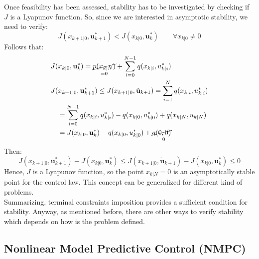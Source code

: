 Once feasibility has been assessed, stability has to be investigated by checking if $J$ is a Lyapunov function. So, since we are interested in asymptotic stability, we need to verify:
\begin{equation}
J(x_{k+1|0},\textbf{u}_{k+1}^*)<J(x_{k|0},\textbf{u}_{k}^*)\qquad \forall x_{k|0} \neq 0
\end{equation}
Follows that:
\begin{equation}
	\begin{split}
		&J(x_{k|0},\textbf{u}_{k}^*)= \underset{=0}{\cancel{p(x_{k|N})}}+\sum_{i=0}^{N-1} q(x_{k|i},u_{k|i}^*) \\
		&J(x_{k+1|0},\textbf{u}_{k+1}^*) \leq J(x_{k+1|0},\tilde{\textbf{u}}_{k+1})=\sum_{i=1}^{N}q(x_{k|i},u_{k|i}^*) \\
		 &\ \ \ = \sum_{i=0}^{N-1}q(x_{k|i},u_{k|i}^*)-q(x_{k|0},u_{k|0}^*)+q(x_{k|N},u_{k|N}) \\
		 &\ \ \ = J(x_{k|0},\textbf{u}_{k}^*)-q(x_{k|0},u_{k|0}^*)+\underset{=0}{\cancel{q(0,0)}} \\
	\end{split}
\end{equation}
Then:
\begin{equation}
	J(x_{k+1|0},\textbf{u}_{k+1}^*)-J(x_{k|0},\textbf{u}_{k}^*)\leq J(x_{k+1|0},\tilde{\textbf{u}}_{k+1})- J(x_{k|0},\textbf{u}_{k}^*)\leq 0
\end{equation}
Hence, $J$ is a Lyapunov function, so the point $x_{k|N}=0$ is an asymptotically stable point for the control law. This concept can be generalized for different kind of problems.\\
Summarizing, terminal constraints imposition provides a sufficient condition for stability. Anyway, as mentioned before, there are other ways to verify stability which depends on how is the problem defined. 

\subsection{Nonlinear Model Predictive Control (NMPC)}

